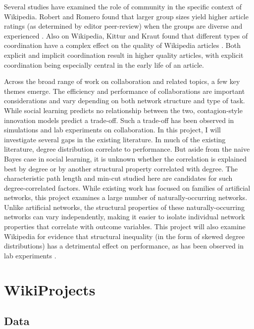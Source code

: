 Several studies have examined the role of community in the specific context
of Wikipedia.
Robert and Romero found that
larger group sizes yield higher article ratings
(as determined by editor peer-review)
when the groups are diverse and experienced
\cite{robert_crowd_2015}.
Also on Wikipedia,
Kittur and Kraut found that different types of coordination have a complex
effect on the quality of Wikipedia articles \cite{kittur_harnessing_2008}.
Both explicit and implicit coordination result in higher quality articles,
with explicit coordination being especially central in the early life of an
article.

Across the broad range of work on collaboration and related topics,
a few key themes emerge.
The efficiency and performance of collaborations are important considerations
and vary depending on both network structure and type of task.
While social learning predicts no relationship between the two,
contagion-style innovation models predict a trade-off.
Such a trade-off has been observed in simulations and lab experiments on
collaboration.
In this project, I will investigate several gaps in the existing literature.
In much of the existing literature,
degree distribution correlate to performance.
But aside from the naive Bayes case in social learning, it is unknown whether
the correlation is explained best by degree or by another structural property
correlated with degree.
The characteristic path length and min-cut studied here are candidates for such
degree-correlated factors.
While existing work has focused on families of artificial networks,
this project examines a large number of naturally-occurring networks.
Unlike artificial networks, the structural properties of these naturally-occurring
networks can vary independently, making it easier to isolate individual
network properties that correlate with outcome variables.
This project will also examine Wikipedia for evidence that structural
inequality (in the form of skewed
degree distributions) has a detrimental effect on performance,
as has been observed in lab experiments
\mbox{\cite{kearns_experiments_2012}}.

\section{WikiProjects}
\label{sec:wp}

\subsection{Data}

